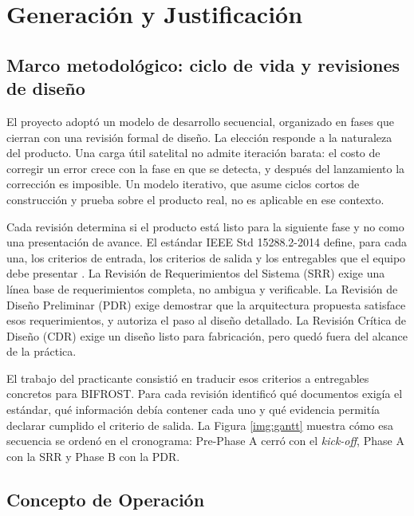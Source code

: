 \section{Generación y Justificación}

\subsection{Marco metodológico: ciclo de vida y revisiones de diseño}

El proyecto adoptó un modelo de desarrollo secuencial, organizado en fases que cierran con una revisión formal de diseño. La elección responde a la naturaleza del producto. Una carga útil satelital no admite iteración barata: el costo de corregir un error crece con la fase en que se detecta, y después del lanzamiento la corrección es imposible. Un modelo iterativo, que asume ciclos cortos de construcción y prueba sobre el producto real, no es aplicable en ese contexto.

Cada revisión determina si el producto está listo para la siguiente fase y no como una presentación de avance. El estándar IEEE Std 15288.2-2014 define, para cada una, los criterios de entrada, los criterios de salida y los entregables que el equipo debe presentar \parencite{ieee15288-2}. La Revisión de Requerimientos del Sistema (SRR) exige una línea base de requerimientos completa, no ambigua y verificable. La Revisión de Diseño Preliminar (PDR) exige demostrar que la arquitectura propuesta satisface esos requerimientos, y autoriza el paso al diseño detallado. La Revisión Crítica de Diseño (CDR) exige un diseño listo para fabricación, pero quedó fuera del alcance de la práctica.

El trabajo del practicante consistió en traducir esos criterios a entregables concretos para BIFROST. Para cada revisión identificó qué documentos exigía el estándar, qué información debía contener cada uno y qué evidencia permitía declarar cumplido el criterio de salida. La Figura \ref{img:gantt} muestra cómo esa secuencia se ordenó en el cronograma: Pre-Phase A cerró con el \textit{kick-off}, Phase A con la SRR y Phase B con la PDR.


\subsection{Concepto de Operación}

